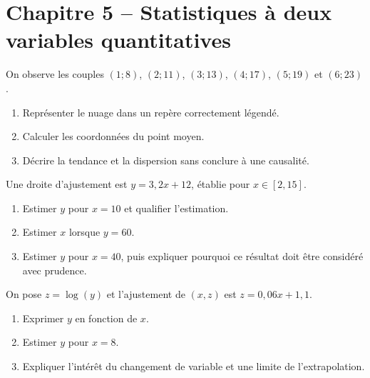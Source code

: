 \section*{Chapitre 5 -- Statistiques à deux variables quantitatives}
\begin{exercice}
On observe les couples $(1;8)$, $(2;11)$, $(3;13)$, $(4;17)$, $(5;19)$ et $(6;23)$.
\begin{enumerate}
\item Représenter le nuage dans un repère correctement légendé.
\item Calculer les coordonnées du point moyen.
\item Décrire la tendance et la dispersion sans conclure à une causalité.
\end{enumerate}
\end{exercice}
\begin{exercice}
Une droite d'ajustement est $y=3{,}2x+12$, établie pour $x\in[2,15]$.
\begin{enumerate}
\item Estimer $y$ pour $x=10$ et qualifier l'estimation.
\item Estimer $x$ lorsque $y=60$.
\item Estimer $y$ pour $x=40$, puis expliquer pourquoi ce résultat doit être considéré avec prudence.
\end{enumerate}
\end{exercice}
\begin{exercice}
On pose $z=\log(y)$ et l'ajustement de $(x,z)$ est $z=0{,}06x+1{,}1$.
\begin{enumerate}
\item Exprimer $y$ en fonction de $x$.
\item Estimer $y$ pour $x=8$.
\item Expliquer l'intérêt du changement de variable et une limite de l'extrapolation.
\end{enumerate}
\end{exercice}

